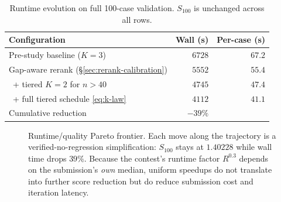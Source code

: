 \documentclass[nolineno]{ieeeaccess}
\begin{document}
\begin{table}[t]
\caption{Runtime evolution on full 100-case validation.
$S_{100}$ is unchanged across all rows.}
\label{tab:runtime}
\centering
\footnotesize
\begin{tabular}{@{}lrr@{}}
\toprule
Configuration & Wall (s) & Per-case (s)\\
\midrule
Pre-study baseline ($K{=}3$) & $6728$ & $67.2$\\
Gap-aware rerank (\S\ref{sec:rerank-calibration}) & $5552$ & $55.4$\\
\ + tiered $K{=}2$ for $n{>}40$ & $4745$ & $47.4$\\
\ + full tiered schedule \eqref{eq:k-law} & $4112$ & $41.1$\\
\midrule
Cumulative reduction & $-39\%$ & \\
\bottomrule
\end{tabular}
\end{table}

\begin{figure}[t]
\centering
{}
\caption{Runtime/quality Pareto frontier. Each move along the
trajectory is a verified-no-regression simplification: $S_{100}$ stays
at $1.40228$ while wall time drops $39\%$. Because the contest's
runtime factor $R^{0.3}$ depends on the submission's \emph{own}
median, uniform speedups do not translate into further score
reduction but do reduce submission cost and iteration latency.}
\label{fig:runtime-pareto}
\end{figure}
\end{document}
